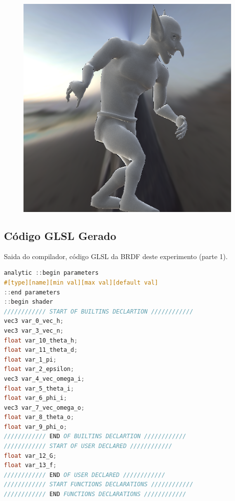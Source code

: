 \begin{figure}[H]
\endminipage\hfill
{}%
  \includegraphics[width=\linewidth]{./Imagens/brdfs/duer-goblin.png}
\endminipage
\end{figure}

\subsection{Código GLSL Gerado}
\begin{codigo}[H]
    \caption{\small Saida do compilador, código GLSL da BRDF deste experimento (parte 1). }
    \label{cod-duer-glsl-pt-1}
\begin{lstlisting}[language=C, inputencoding=utf8]
analytic ::begin parameters
#[type][name][min val][max val][default val]
::end parameters
::begin shader
//////////// START OF BUILTINS DECLARTION ////////////
vec3 var_0_vec_h;
vec3 var_3_vec_n;
float var_10_theta_h;
float var_11_theta_d;
float var_1_pi;
float var_2_epsilon;
vec3 var_4_vec_omega_i;
float var_5_theta_i;
float var_6_phi_i;
vec3 var_7_vec_omega_o;
float var_8_theta_o;
float var_9_phi_o;
//////////// END OF BUILTINS DECLARTION ////////////
//////////// START OF USER DECLARED ////////////
float var_12_G;
float var_13_f;
//////////// END OF USER DECLARED ////////////
//////////// START FUNCTIONS DECLARATIONS ////////////
//////////// END FUNCTIONS DECLARATIONS ////////////

\end{lstlisting}
\end{codigo}

